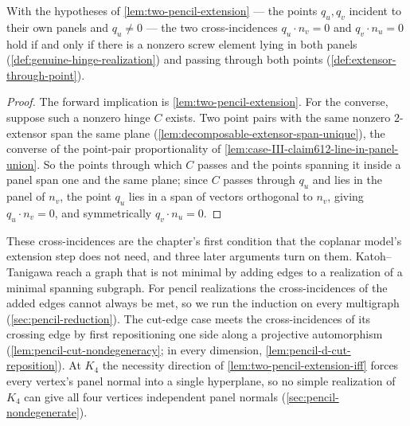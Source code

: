 \begin{lemma}
  \label{lem:two-pencil-extension-iff}
  \leanok
  With the hypotheses of \cref{lem:two-pencil-extension} --- the points
  $q_u, q_v$ incident to their own panels and $q_u \ne 0$ --- the two
  cross-incidences $q_u \cdot n_v = 0$ and $q_v \cdot n_u = 0$ hold if and
  only if there is a nonzero screw element lying in both panels
  (\cref{def:genuine-hinge-realization}) and passing through both points
  (\cref{def:extensor-through-point}).
\end{lemma}
\begin{proof}
  \leanok
  The forward implication is \cref{lem:two-pencil-extension}. For the
  converse, suppose such a nonzero hinge $C$ exists. Two point pairs with the same nonzero
  $2$-extensor span the same plane (\cref{lem:decomposable-extensor-span-unique}), the converse of
  the point-pair proportionality of \cref{lem:case-III-claim612-line-in-panel-union}.
  So the points through which $C$ passes and the points spanning it inside a
  panel span one and the same plane; since $C$ passes through $q_u$ and lies
  in the panel of $n_v$, the point $q_u$ lies in a span of vectors orthogonal
  to $n_v$, giving $q_u \cdot n_v = 0$, and symmetrically $q_v \cdot n_u = 0$.
\end{proof}

These cross-incidences are the chapter's first condition that the
coplanar model's extension step does not need, and three later
arguments turn on them. Katoh--Tanigawa reach a graph that is not
minimal by adding edges to a realization of a minimal spanning subgraph.
For pencil realizations the cross-incidences of the added edges cannot
always be met, so we run the induction on every multigraph
(\cref{sec:pencil-reduction}). The cut-edge case meets the
cross-incidences of its crossing edge by first repositioning one side
along a projective automorphism (\cref{lem:pencil-cut-nondegeneracy};
in every dimension, \cref{lem:pencil-d-cut-reposition}).
At $K_4$ the necessity direction
of \cref{lem:two-pencil-extension-iff} forces every vertex's panel
normal into a single hyperplane, so no simple realization of $K_4$ can
give all four vertices independent panel normals
(\cref{sec:pencil-nondegenerate}).

